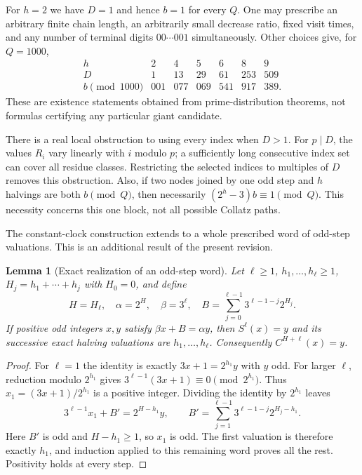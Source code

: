 \documentclass[11pt,a4paper]{article}
\newtheorem{lemma}[theorem]{Lemma}
\theoremstyle{definition}
\theoremstyle{remark}
\numberwithin{equation}{section}
\begin{document}
For $h=2$ we have $D=1$ and hence $b=1$ for every $Q$.
One may prescribe an arbitrary finite chain length, an arbitrarily
small decrease ratio, fixed visit times, and any number of terminal
digits $00\cdots001$ simultaneously. Other choices give, for $Q=1000$,
\[
\begin{array}{c|rrrrrr}
h&2&4&5&6&8&9\\\hline
D&1&13&29&61&253&509\\
b\pmod{1000}&001&077&069&541&917&389.
\end{array}
\]
These are existence statements obtained from prime-distribution
theorems, not formulas certifying any particular giant candidate.

There is a real local obstruction to using every index when $D>1$.
For $p\mid D$, the values $R_i$ vary linearly with $i$ modulo $p$;
a sufficiently long consecutive index set can cover all residue classes.
Restricting the selected indices to multiples of $D$ removes this
obstruction. Also, if two nodes joined by one odd step and $h$ halvings
are both $b\pmod Q$, then necessarily $(2^h-3)b\equiv1\pmod Q$.
This necessity concerns this one block, not all possible Collatz paths.

The constant-clock construction extends to a whole prescribed word of
odd-step valuations. This is an additional result of the present revision.

\begin{lemma}[Exact realization of an odd-step word]
\label{A:lem:odd-clock-realization}
Let $\ell\ge1$, $h_1,\ldots,h_\ell\ge1$,
$H_j=h_1+\cdots+h_j$ with $H_0=0$, and define
\[
 H=H_\ell,\quad \alpha=2^H,\quad \beta=3^\ell,\quad
 B=\sum_{j=0}^{\ell-1}3^{\ell-1-j}2^{H_j}.
\]
If positive odd integers $x,y$ satisfy $\beta x+B=\alpha y$, then
$S^\ell(x)=y$ and its successive exact halving valuations are
$h_1,\ldots,h_\ell$. Consequently $C^{H+\ell}(x)=y$.
\end{lemma}
\begin{proof}
For $\ell=1$ the identity is exactly $3x+1=2^{h_1}y$ with $y$ odd.
For larger $\ell$, reduction modulo $2^{h_1}$ gives
$3^{\ell-1}(3x+1)\equiv0\pmod{2^{h_1}}$. Thus
$x_1=(3x+1)/2^{h_1}$ is a positive integer. Dividing the identity by
$2^{h_1}$ leaves
\[
 3^{\ell-1}x_1+B'=2^{H-h_1}y,
 \qquad B'=\sum_{j=1}^{\ell-1}3^{\ell-1-j}2^{H_j-h_1}.
\]
Here $B'$ is odd and $H-h_1\ge1$, so $x_1$ is odd. The first
valuation is therefore exactly $h_1$, and induction applied to this
remaining word proves all the rest. Positivity holds at every step.
\end{proof}
\end{document}
